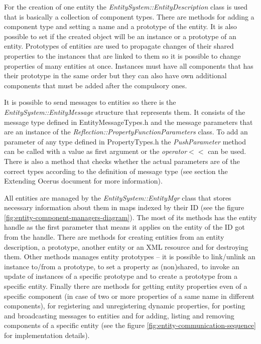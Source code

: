\documentclass[a4paper, 12pt]{report}
\begin{document}
For the creation of one entity the \emph{EntitySystem::EntityDescription} class is used that is basically a collection of component types. There are methods for adding a component type and setting a name and a prototype of the entity. It is also possible to set if the created object will be an instance or a prototype of an entity. Prototypes of entities are used to propagate changes of their shared properties to the instances that are linked to them so it is possible to change properties of many entities at once. Instances must have all components that has their prototype in the same order but they can also have own additional components that must be added after the compulsory ones.

It is possible to send messages to entities so there is the \emph{EntitySystem::EntityMessage} structure that represents them. It consists of the message type defined in EntityMessageTypes.h and the message parameters that are an instance of the \emph{Reflection::PropertyFunctionParameters} class. To add an parameter of any type defined in PropertyTypes.h the \emph{PushParameter} method can be called with a value as first argument or the \emph{operator}$<<$ can be used. There is also a method that checks whether the actual parameters are of the correct types according to the definition of message type (see section the Extending Ocerus document for more information).

All entities are managed by the \emph{EntitySystem::EntityMgr} class that stores necessary information about them in maps indexed by their ID (see the figure \ref{fig:entity-component-managers-diagram}). The most of its methods has the entity handle as the first parameter that means it applies on the entity of the ID got from the handle. There are methods for creating entities from an entity description, a prototype, another entity or an XML resource and for destroying them. Other methods manages entity prototypes -- it is possible to link/unlink an instance to/from a prototype, to set a property as (non)shared, to invoke an update of instances of a specific prototype and to create a prototype from a specific entity. Finally there are methods for getting entity properties even of a specific component (in case of two or more properties of a same name in different components), for registering and unregistering dynamic properties, for posting and broadcasting messages to entities and for adding, listing and removing components of a specific entity (see the figure \ref{fig:entity-communication-sequence} for implementation details).
\end{document}
